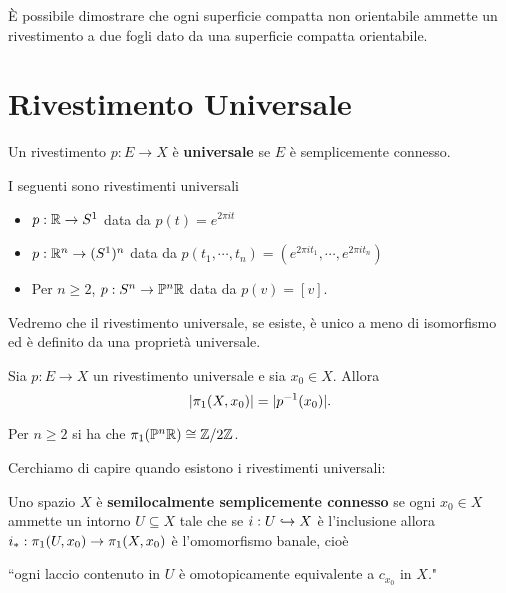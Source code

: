\begin{multicols*}{2}
\begin{fact}
\`E possibile dimostrare che ogni superficie compatta non orientabile ammette un rivestimento a due fogli dato da una superficie compatta orientabile.
\end{fact}

\section{Rivestimento Universale}
\begin{definition}
Un rivestimento $p:E\to X$ \`e \textbf{universale} se $E$ \`e semplicemente connesso.
\end{definition}

\begin{example}
I seguenti sono rivestimenti universali
\begin{itemize}[noitemsep]
\item $p:\mathbb{R}\to S^1$ data da $p(t)=e^{2\pi it}$
\item $p:\mathbb{R}^n\to (S^1)^n$ data da $p(t_1,\cdots, t_n)=(e^{2\pi it_1},\cdots, e^{2\pi it_n})$
\item Per $n\geq 2$, $p:S^n\to \mathbb{P}^n\mathbb{R}$ data da $p(v)=[v]$.
\end{itemize}
\end{example}

Vedremo che il rivestimento universale, se esiste, \`e unico a meno di isomorfismo ed \`e definito da una propriet\`a universale.

\begin{theorem}\label{GruppoFondamentaleEFibraSonoInBigezione}
Sia $p:E\to X$ un rivestimento universale e sia $x_0\in X$. Allora
\[|\pi_1(X,x_0)|=|p^{-1}(x_0)|.\]
\end{theorem}

\begin{example}
Per $n\geq 2$ si ha che $\pi_1(\mathbb{P}^n\mathbb{R})\cong {\mathbb{Z}/2\mathbb{Z}}$.
\end{example}

\noindent
Cerchiamo di capire quando esistono i rivestimenti universali:
\begin{definition}
Uno spazio $X$ \`e \textbf{semilocalmente semplicemente connesso} se ogni $x_0\in X$ ammette un intorno $U\subseteq X$ tale che se $i:U\hookrightarrow X$ \`e l'inclusione allora $i_\ast:\pi_1(U,x_0)\to \pi_1(X,x_0)$ \`e l'omomorfismo banale, cio\`e
\begin{center}
``ogni laccio contenuto in $U$ \`e omotopicamente equivalente a $c_{x_0}$ in $X$."
\end{center}
\end{definition}


\end{multicols*}

